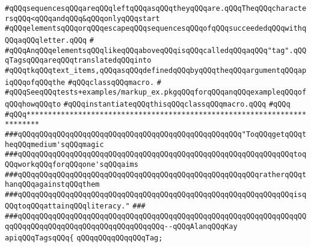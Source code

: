 \verb|#qQQqsequencesqQQqareqQQqleftqQQqasqQQqtheyqQQqare.qQQqTheqQQqcharactersqQQq<qQQqandqQQq&qQQqonlyqQQqstart|\newline
\verb|#qQQqelementsqQQqorqQQqescapeqQQqsequencesqQQqofqQQqsucceededqQQqwithqQQqaqQQqletter.qQQq|\newline
\verb|#|\newline
\verb|#qQQqAnqQQqelementsqQQqlikeqQQqaboveqQQqisqQQqcalledqQQqaqQQq"tag".qQQqTagsqQQqareqQQqtranslatedqQQqinto|\newline
\verb|#qQQqtkqQQqtext_items,qQQqasqQQqdefinedqQQqbyqQQqtheqQQqargumentqQQqapiqQQqofqQQqthe|\newline
\verb|#qQQqclassqQQqmacro.|\newline
\verb|#|\newline
\verb|#qQQqSeeqQQqtests+examples/markup_ex.pkgqQQqforqQQqanqQQqexampleqQQqofqQQqhowqQQqto|\newline
\verb|#qQQqinstantiateqQQqthisqQQqclassqQQqmacro.qQQq|\newline
\verb|#qQQq|\newline
\verb|#qQQq*************************************************************************|\newline
\newline
\newline
\newline
\verb|###qQQqqQQqqQQqqQQqqQQqqQQqqQQqqQQqqQQqqQQqqQQqqQQqqQQq"ToqQQqgetqQQqtheqQQqmedium'sqQQqmagic|\newline
\verb|###qQQqqQQqqQQqqQQqqQQqqQQqqQQqqQQqqQQqqQQqqQQqqQQqqQQqqQQqqQQqqQQqtoqQQqworkqQQqforqQQqone'sqQQqaims|\newline
\verb|###qQQqqQQqqQQqqQQqqQQqqQQqqQQqqQQqqQQqqQQqqQQqqQQqqQQqqQQqratherqQQqthanqQQqagainstqQQqthem|\newline
\verb|###qQQqqQQqqQQqqQQqqQQqqQQqqQQqqQQqqQQqqQQqqQQqqQQqqQQqqQQqqQQqqQQqisqQQqtoqQQqattainqQQqliteracy."|\newline
\verb|###|\newline
\verb|###qQQqqQQqqQQqqQQqqQQqqQQqqQQqqQQqqQQqqQQqqQQqqQQqqQQqqQQqqQQqqQQqqQQqqQQqqQQqqQQqqQQqqQQqqQQqqQQqqQQqqQQq--qQQqAlanqQQqKay|\newline
\newline
\newline
\newline
\verb|apiqQQqTagsqQQq{|\newline
\newline
\verb|qQQqqQQqqQQqqQQqTag;|\newline
\newline
